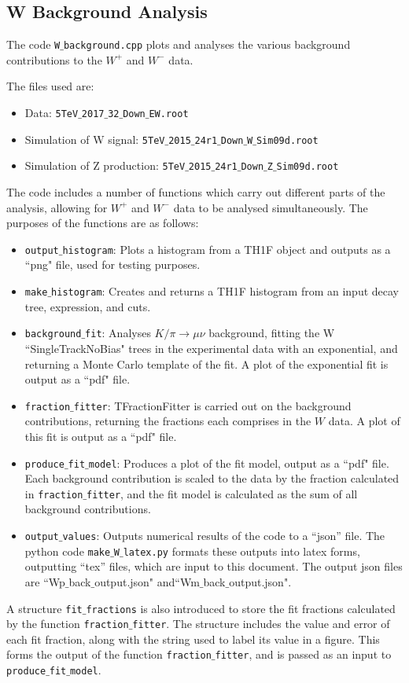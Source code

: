\documentclass[a4paper,12pt]{article}
\begin{document}
\subsection{W Background Analysis} \label{sec: W background}

The code \texttt{W$\_$background.cpp} plots and analyses the various background contributions to the $W^+$ and $W^-$ data.

The files used are:
\begin{itemize}
    \item Data: \texttt{5TeV$\_$2017$\_$32$\_$Down$\_$EW.root}
    \item Simulation of W signal: \texttt{5TeV$\_$2015$\_$24r1$\_$Down$\_$W$\_$Sim09d.root}
    \item Simulation of Z production: \texttt{5TeV$\_$2015$\_$24r1$\_$Down$\_$Z$\_$Sim09d.root}
\end{itemize}

The code includes a number of functions which carry out different parts of the analysis, allowing for $W^+$ and $W^-$ data to be analysed simultaneously. The purposes of the functions are as follows:
\begin{itemize}
    \item \texttt{output$\_$histogram}: Plots a histogram from a TH1F object and outputs as a ``png" file, used for testing purposes.
    \item \texttt{make$\_$histogram}: Creates and returns a TH1F histogram from an input decay tree, expression, and cuts.
    \item \texttt{background$\_$fit}: Analyses $K/\pi \xrightarrow{} \mu\nu$ background, fitting the W ``SingleTrackNoBias" trees in the experimental data with an exponential, and returning a Monte Carlo template of the fit. A plot of the exponential fit is output as a ``pdf" file.
    \item \texttt{fraction$\_$fitter}: TFractionFitter is carried out on the background contributions, returning the fractions each comprises in the $W$ data. A plot of this fit is output as a ``pdf" file. 
    \item \texttt{produce$\_$fit$\_$model}: Produces a plot of the fit model, output as a ``pdf" file. Each background contribution is scaled to the data by the fraction calculated in \texttt{fraction$\_$fitter}, and the fit model is calculated as the sum of all background contributions.
    \item \texttt{output$\_$values}: Outputs numerical results of the code to a ``json'' file. The python code \texttt{make$\_$W$\_$latex.py} formats these outputs into latex forms, outputting ``tex'' files, which are input to this document. The output json files are ``Wp$\_$back$\_$output.json" and``Wm$\_$back$\_$output.json".
\end{itemize}
A structure \texttt{fit$\_$fractions} is also introduced to store the fit fractions calculated by the function \texttt{fraction$\_$fitter}. The structure includes the value and error of each fit fraction, along with the string used to label its value in a figure. This forms the output of the function \texttt{fraction$\_$fitter}, and is passed as an input to \texttt{produce$\_$fit$\_$model}.
\end{document}
